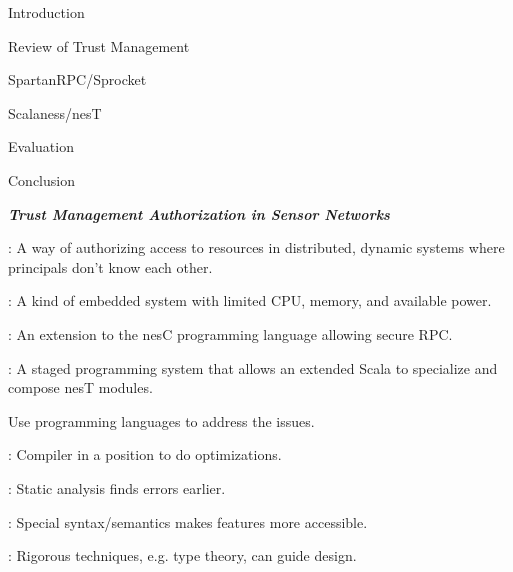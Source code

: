 
\newcommand{\cedge}[1]{\stackrel{#1}{\longleftarrow}}
\newcommand{\cred}[3]{\mathit{#1} \cedge{#3} \mathit{#2}}
\newcommand{\datalog}{\text{Datalog}}
\newcommand\T{\rule{0pt}{2.1ex}}

\begin{cenumerate}
\item Introduction
\item Review of Trust Management
\item SpartanRPC/Sprocket
\item Scalaness/nesT
\item Evaluation
\item Conclusion
\end{cenumerate}
\stopslide


\centerline{\emph{\textbf{Trust Management Authorization in Sensor Networks}}}

\begin{citemize}
\item {}: A way of authorizing access to resources in distributed, dynamic
  systems where principals don't know each other.

\item {}: A kind of embedded system with limited CPU, memory, and available
  power.
\end{citemize}
\stopslide


\begin{citemize}
\item {}: An extension to the nesC programming language allowing secure RPC.

\item {}: A staged programming system that allows an extended Scala to
  specialize and compose nesT modules.
\end{citemize}

\stopslide


Use programming languages to address the issues.

\begin{citemize}
\item {}: Compiler in a position to do optimizations.
\item {}: Static analysis finds errors earlier.
\item {}: Special syntax/semantics makes features more accessible.
\item {}: Rigorous techniques, e.g. type theory, can guide design.
\end{citemize}
\stopslide

